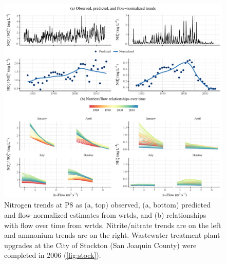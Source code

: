 \documentclass[letterpaper,12pt,oneside]{article}\usepackage[]{graphicx}\usepackage[]{color}
\begin{document}
\begin{figure}[!ht]

{\centering \includegraphics[width=\textwidth]{figs/p8trnds-1} 

}

\caption{Nitrogen trends at P8 as (a, top) observed, (a, bottom) predicted and flow-normalized estimates from \ac{wrtds}, and (b) relationships with flow over time from \ac{wrtds}.  Nitrite/nitrate trends are on the left and ammonium trends are on the right.  Wastewater treatment plant upgrades at the City of Stockton (San Joaquin County) were completed in 2006 (\cref{fig:stock}).}\label{fig:p8trnds}
\end{figure}
\end{document}
